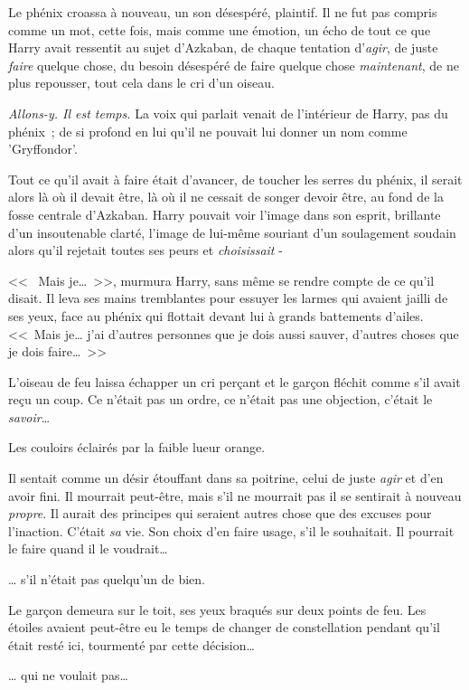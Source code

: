 Le phénix croassa à nouveau, un son désespéré, plaintif. Il ne fut pas compris comme un mot, cette fois, mais comme une émotion, un écho de tout ce que Harry avait ressentit au sujet d'Azkaban, de chaque tentation d'\emph{agir}, de juste \emph{faire} quelque chose, du besoin désespéré de faire quelque chose \emph{maintenant}, de ne plus repousser, tout cela dans le cri d'un oiseau.

\emph{Allons-y. Il est temps.} La voix qui parlait venait de l'intérieur de Harry, pas du phénix~; de si profond en lui qu'il ne pouvait lui donner un nom comme 'Gryffondor'.

Tout ce qu'il avait à faire était d'avancer, de toucher les serres du phénix, il serait alors là où il devait être, là où il ne cessait de songer devoir être, au fond de la fosse centrale d'Azkaban. Harry pouvait voir l'image dans son esprit, brillante d'un insoutenable clarté, l'image de lui-même souriant d'un soulagement soudain alors qu'il rejetait toutes ses peurs et \emph{choisissait} -

<<~ Mais je…~>>, murmura Harry, sans même se rendre compte de ce qu'il disait. Il leva ses mains tremblantes pour essuyer les larmes qui avaient jailli de ses yeux, face au phénix qui flottait devant lui à grands battements d'ailes. <<~Mais je… j'ai d'autres personnes que je dois aussi sauver, d'autres choses que je dois faire…~>>

L'oiseau de feu laissa échapper un cri perçant et le garçon fléchit comme s'il avait reçu un coup. Ce n'était pas un ordre, ce n'était pas une objection, c'était le \emph{savoir}…

Les couloirs éclairés par la faible lueur orange.

Il sentait comme un désir étouffant dans sa poitrine, celui de juste \emph{agir} et d'en avoir fini. Il mourrait peut-être, mais s'il ne mourrait pas il se sentirait à nouveau \emph{propre}. Il aurait des principes qui seraient autres chose que des excuses pour l'inaction. C'était \emph{sa} vie. Son choix d'en faire usage, s'il le souhaitait. Il pourrait le faire quand il le voudrait…

… s'il n'était pas quelqu'un de bien.

\later

Le garçon demeura sur le toit, ses yeux braqués sur deux points de feu. Les étoiles avaient peut-être eu le temps de changer de constellation pendant qu'il était resté ici, tourmenté par cette décision…

… qui ne voulait pas…

